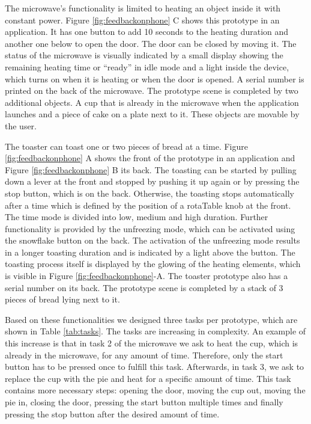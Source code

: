\documentclass[11pt, a4paper]{article}
\begin{document}
			The microwave's functionality is limited to heating an object inside it with constant power. Figure \ref{fig:feedbackonphone} C shows this prototype in an application. It has one button to add 10 seconds to the heating duration and another one below to open the door. The door can be closed by moving it. The status of the microwave is visually indicated by a small display showing the remaining heating time or ``ready'' in idle mode and a light inside the device, which turns on when it is heating or when the door is opened. A serial number is printed on the back of the microwave. The prototype scene is completed by two additional objects. A cup that is already in the microwave when the application launches and a piece of cake on a plate next to it. These objects are movable by the user.

			The toaster can toast one or two pieces of bread at a time. Figure \ref{fig:feedbackonphone} A shows the front of the prototype in an application and Figure \ref{fig:feedbackonphone} B its back. The toasting can be started by pulling down a lever at the front and stopped by pushing it up again or by pressing the stop button, which is on the back. Otherwise, the toasting stops automatically after a time which is defined by the position of a rotaTable knob at the front. The time mode is divided into low, medium and high duration. Further functionality is provided by the unfreezing mode, which can be activated using the snowflake button on the back. The activation of the unfreezing mode results in a longer toasting duration and is indicated by a light above the button. The toasting process itself is displayed by the glowing of the heating elements, which is visible in Figure \ref{fig:feedbackonphone}-A. The toaster prototype also has a serial number on its back. The prototype scene is completed by a stack of 3 pieces of bread lying next to it. 
			
			Based on these functionalities we designed three tasks per prototype, which are shown in Table \ref{tab:tasks}. The tasks are increasing in complexity. An example of this increase is that in task 2 of the microwave we ask to heat the cup, which is already in the microwave, for any amount of time. Therefore, only the start button has to be pressed once to fulfill this task. Afterwards, in task 3, we ask to replace the cup with the pie and heat for a specific amount of time. This task contains more necessary steps: opening the door, moving the cup out, moving the pie in, closing the door, pressing the start button multiple times and finally pressing the stop button after the desired amount of time. 
\end{document}

